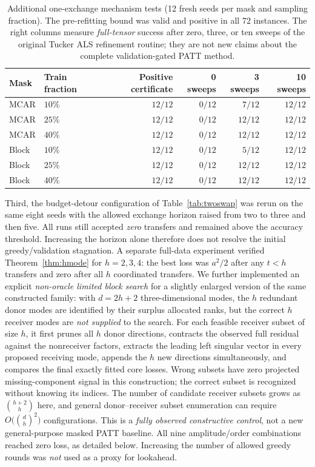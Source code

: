\documentclass[review,10pt]{elsarticle}
\begin{document}
\begin{table}[tbp]
\caption{Additional one-exchange mechanism tests (12 fresh seeds per mask and sampling fraction). The pre-refitting bound was valid and positive in all 72 instances. The right columns measure \emph{full-tensor} success after zero, three, or ten sweeps of the original Tucker ALS refinement routine; they are not new claims about the complete validation-gated PATT method.}\label{tab:refinecontrol}
\centering\small
\begin{tabular}{llrrrr}
\toprule
Mask & Train fraction & Positive certificate & 0 sweeps & 3 sweeps & 10 sweeps\\
\midrule
MCAR & $10\%$ & $12/12$ & $0/12$ & $7/12$ & $12/12$\\
MCAR & $25\%$ & $12/12$ & $0/12$ & $12/12$ & $12/12$\\
MCAR & $40\%$ & $12/12$ & $0/12$ & $12/12$ & $12/12$\\
Block & $10\%$ & $12/12$ & $0/12$ & $5/12$ & $12/12$\\
Block & $25\%$ & $12/12$ & $0/12$ & $12/12$ & $12/12$\\
Block & $40\%$ & $12/12$ & $0/12$ & $12/12$ & $12/12$\\
\bottomrule
\end{tabular}
\end{table}

Third, the budget-detour configuration of Table~\ref{tab:twoswap} was rerun on the same eight seeds with the allowed exchange horizon raised from two to three and then five. All runs still accepted \emph{zero} transfers and remained above the accuracy threshold. Increasing the horizon alone therefore does not resolve the initial greedy/validation stagnation. A separate full-data experiment verified Theorem~\ref{thm:hmode} for $h=2,3,4$: the best loss was $a^2/2$ after any $t<h$ transfers and zero after all $h$ coordinated transfers. We further implemented an explicit \emph{non-oracle limited block search} for a slightly enlarged version of the same constructed family: with $d=2h+2$ three-dimensional modes, the $h$ redundant donor modes are identified by their surplus allocated ranks, but the correct $h$ receiver modes are \emph{not supplied} to the search. For each feasible receiver subset of size $h$, it first prunes all $h$ donor directions, contracts the observed full residual against the nonreceiver factors, extracts the leading left singular vector in every proposed receiving mode, appends the $h$ new directions simultaneously, and compares the final exactly fitted core losses. Wrong subsets have zero projected missing-component signal in this construction; the correct subset is recognized without knowing its indices. The number of candidate receiver subsets grows as $\binom{h+2}{h}$ here, and general donor--receiver subset enumeration can require $O\bigl(\binom{d}{h}^2\bigr)$ configurations. This is a \emph{fully observed constructive control}, not a new general-purpose masked PATT baseline. All nine amplitude/order combinations reached zero loss, as detailed below. Increasing the number of allowed greedy rounds was \emph{not} used as a proxy for lookahead.
\end{document}
